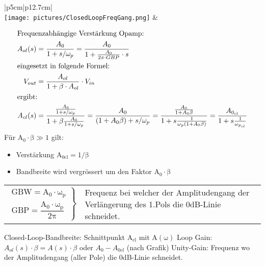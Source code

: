 \vspace{-2.5\topsep}
\begin{longtable}[t]{|p{5cm}|p{12.7cm}|}
    \hline  
    \\ \hdashline
    \texttt{[image: pictures/ClosedLoopFreqGang.png]}
    & {\vspace{-1.5\topsep}
        \begin{align*}
            \intertext{Frequenzabhängige Verstärkung Opamp:}
            A_{ol}(s) &= \frac{A_0}{1 + s/\omega_p} = \frac{A_0}{1+\frac{A_0}{2\pi \cdot GBP} \cdot s}\\
            \intertext{eingesetzt in folgende Formel:}
            V_{out} &= \frac{A_{ol}}{1 + \beta \cdot A_{ol}} \cdot V_{in}\\
            \intertext{ergibt:}
            A_{cl}(s) &= \frac{\frac{A_0}{1 + s/\omega_p}}{1 + \beta \frac{A_0}{1 + s/\omega_p}} = 
            \frac{A_0}{(1 + A_0 \beta) + s/\omega_p} = 
            \frac{\frac{A_0}{1 + A_0 \beta}}{1 + s \frac{1}
            {\omega_p(1 + A_0 \beta)}} = 
            \frac{A_{0_{cl}}}{1 + s\frac{1}{\omega_{p_{cl}}}}
        \end{align*}
        \newline
        Für $\mathrm{A_0 \cdot \beta \gg 1}$ gilt:\newline
        \vspace{-1.5\topsep}
        \begin{itemize}[leftmargin=*]
            \item Verstärkung $\mathrm{A_{0cl} = 1/\beta}$
            \item Bandbreite wird vergrössert um den Faktor $\mathrm{A_0 \cdot\beta}$
            \newline
        \end{itemize}
        \begin{tabular}{lp{8cm}}
          $\left.\begin{matrix}
            \mathrm{GBW = A_0 \cdot \omega_p}\\
            \mathrm{GBP = \dfrac{A_0 \cdot \omega_p}{2\pi}}
          \end{matrix}\right\rbrace$ &
          Frequenz bei welcher der Amplitudengang der Verlängerung des 1.Pols die 0dB-Linie schneidet.
        \end{tabular} \newline
        Closed-Loop-Bandbreite: Schnittpunkt $\mathrm{A_{cl}}$ mit $\mathrm{A(\omega)}$\newline
        Loop Gain: $A_{ol}(s) \cdot \beta = A(s) \cdot \beta$ oder $A_0 - A_{0cl}$ (nach Grafik) \newline
        Unity-Gain: Frequenz wo der Amplitudengang (aller Pole) die 0dB-Linie schneidet.
    }
    \\ \hline
\end{longtable}


